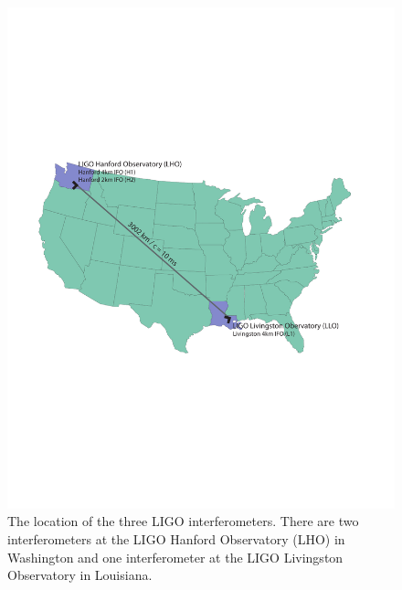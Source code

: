 \begin{figure}[p]
\label{f:usmap}
\begin{center}
\includegraphics[width=\linewidth]{figures/inspiral/observatories}
\end{center}
\caption[Location of LIGO Interferometers]{%
The location of the three LIGO interferometers. There are two interferometers
at the LIGO Hanford Observatory (LHO) in Washington and one interferometer at
the LIGO Livingston Observatory in Louisiana.
}
\end{figure}

